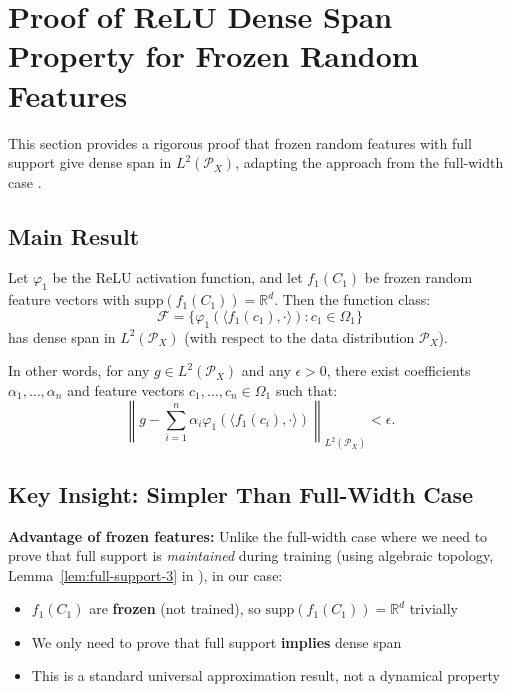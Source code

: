 \section{Proof of ReLU Dense Span Property for Frozen Random Features}
\label{sec:relu-dense-span-proof}

This section provides a rigorous proof that frozen random features with full support give dense span in $L^2(\mathcal{P}_X)$, adapting the approach from the full-width case \cite{nguyen2023rigorousframeworkmeanfield}.

\subsection{Main Result}

\begin{theorem}
\label{thm:relu-dense-span}
Let $\varphi_1$ be the ReLU activation function, and let $f_1(C_1)$ be frozen random feature vectors with $\text{supp}(f_1(C_1)) = \mathbb{R}^d$. Then the function class:
\[
\mathcal{F} = \{\varphi_1(\langle f_1(c_1), \cdot\rangle) : c_1 \in \Omega_1\}
\]
has dense span in $L^2(\mathcal{P}_X)$ (with respect to the data distribution $\mathcal{P}_X$).

In other words, for any $g \in L^2(\mathcal{P}_X)$ and any $\epsilon > 0$, there exist coefficients $\alpha_1, \ldots, \alpha_n$ and feature vectors $c_1, \ldots, c_n \in \Omega_1$ such that:
\[
\left\|g - \sum_{i=1}^n \alpha_i \varphi_1(\langle f_1(c_i), \cdot\rangle)\right\|_{L^2(\mathcal{P}_X)} < \epsilon.
\]
\end{theorem}

\subsection{Key Insight: Simpler Than Full-Width Case}

\textbf{Advantage of frozen features:} Unlike the full-width case where we need to prove that full support is \emph{maintained} during training (using algebraic topology, Lemma~\ref{lem:full-support-3} in \cite{nguyen2023rigorousframeworkmeanfield}), in our case:
\begin{itemize}
\item $f_1(C_1)$ are \textbf{frozen} (not trained), so $\text{supp}(f_1(C_1)) = \mathbb{R}^d$ trivially
\item We only need to prove that full support \textbf{implies} dense span
\item This is a standard universal approximation result, not a dynamical property
\end{itemize}

